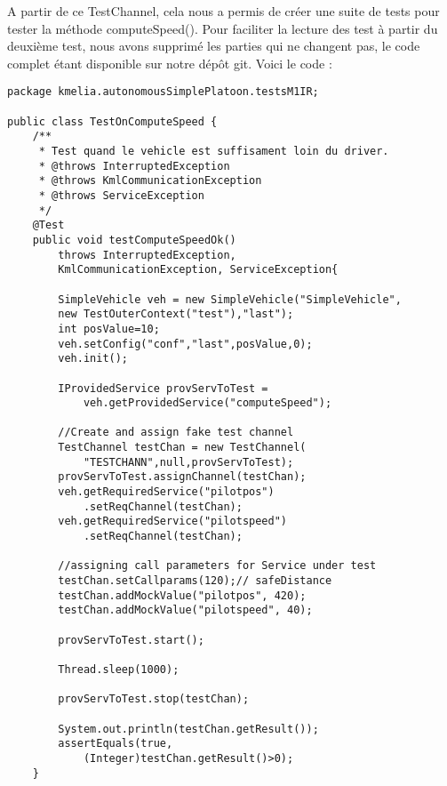\clearpage

A partir de ce TestChannel, cela nous a permis de créer une suite de tests pour tester la méthode computeSpeed(). Pour faciliter la lecture des test à partir du deuxième test, nous avons supprimé les parties qui ne changent pas, le code complet étant disponible sur notre dépôt git. 
Voici le code :

\begin{lstlisting}[frame=single, caption={TestOnComputeSpeed.java},label=fig:JUnitTestOnComputeSpeed]
package kmelia.autonomousSimplePlatoon.testsM1IR;

public class TestOnComputeSpeed {
    /**
     * Test quand le vehicle est suffisament loin du driver.
     * @throws InterruptedException
     * @throws KmlCommunicationException
     * @throws ServiceException
     */
    @Test
    public void testComputeSpeedOk() 
        throws InterruptedException,
        KmlCommunicationException, ServiceException{		

        SimpleVehicle veh = new SimpleVehicle("SimpleVehicle", 
        new TestOuterContext("test"),"last");
        int posValue=10;
        veh.setConfig("conf","last",posValue,0);
        veh.init();	
        
        IProvidedService provServToTest =
            veh.getProvidedService("computeSpeed");
            
        //Create and assign fake test channel 
        TestChannel testChan = new TestChannel(
            "TESTCHANN",null,provServToTest);
        provServToTest.assignChannel(testChan);
        veh.getRequiredService("pilotpos")
            .setReqChannel(testChan);
        veh.getRequiredService("pilotspeed")
            .setReqChannel(testChan);		
            
        //assigning call parameters for Service under test
        testChan.setCallparams(120);// safeDistance
        testChan.addMockValue("pilotpos", 420);
        testChan.addMockValue("pilotspeed", 40);	
        
        provServToTest.start();
        
        Thread.sleep(1000); 
        
        provServToTest.stop(testChan);
        
        System.out.println(testChan.getResult());
        assertEquals(true,
            (Integer)testChan.getResult()>0);	
    }	
	

\end{lstlisting}

